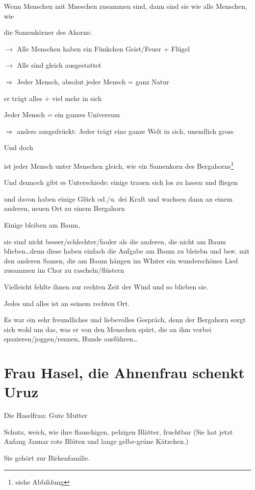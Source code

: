 \documentclass[11pt,titlepage,a5paper]{book}
\begin{document}
Wenn Menschen mit Mneschen zusammen sind, dann sind sie wie alle Menschen, wie

die Samenkörner des Ahorns:

$\rightarrow$ Alle Menschen haben ein Fünkchen Geist/Feuer + Flügel

$\rightarrow$ Alle sind gleich ausgestattet

$\Rightarrow$ Jeder Mensch, absolut jeder Mensch = ganz Natur

er trägt alles + viel mehr in sich

Jeder Mensch = ein ganzes Universum

$\Rightarrow$ anders ausgedrückt: Jeder trägt eine ganze Welt in sich, unendlich gross

Und doch

ist jeder Mensch unter Menschen gleich, wie ein Samenkorn des Bergahorns\footnote{siehe Abbildung}

Und dennoch gibt es Unterschiede: einige trauen sich los zu lassen und fliegen

und davon haben einige Glück od./u. dei Kraft und wachsen dann an einem anderen, neuen Ort zu einem Bergahorn

Einige bleiben am Baum,

sie sind nicht besser/schlechter/fauler als die anderen, die nicht am Baum blieben\dots denn diese haben einfach die Aufgabe am Baum zu bleiebn und bsw. mit den anderen Samen, die am Baum hängen im WInter ein wunderschönes Lied zusammen im Chor zu rascheln/flüstern

Vielleicht fehlte ihnen zur rechten Zeit der Wind und so blieben sie.

Jedes und alles ist an seinem rechten Ort.

Es war ein sehr freundliches und liebevolles Gespräch, denn der Bergahorn sorgt sich wohl um das, was er von den Menschen spürt, die an ihm vorbei spazieren/joggen/rennen, Hunde ausführen\dots  


\section*{Frau Hasel, die Ahnenfrau schenkt Uruz  }

Die Haselfrau: Gute Mutter

Schutz, weich, wie ihre flauschigen, pelzigen Blätter, fruchtbar (Sie hat jetzt Anfang Januar rote Blüten und lange gelbe-grüne Kätzchen.)

Sie gehört zur Birkenfamilie.
\end{document}
